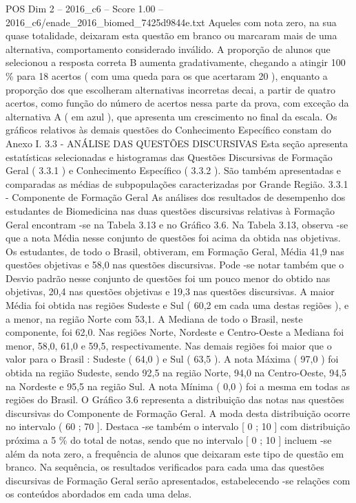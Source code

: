\begin{textsample}{POS Dim 2 – 2016\_c6 – Score 1.00 – 2016\_c6/enade\_2016\_biomed\_7425d9844e.txt}
Aqueles com nota zero, na sua quase totalidade, deixaram esta questão em branco ou marcaram mais de uma alternativa, comportamento considerado inválido.
A proporção de alunos que selecionou a resposta correta B aumenta gradativamente, chegando a atingir 100 \% para 18 acertos ( com uma queda para os que acertaram 20 ), enquanto a proporção dos que escolheram alternativas incorretas decai, a partir de quatro acertos, como função do número de acertos nessa parte da prova, com exceção da alternativa A ( em azul ), que apresenta um crescimento no final da escala.
Os gráficos relativos às demais questões do Conhecimento Específico constam do Anexo I. 3.3 - ANÁLISE DAS QUESTÕES DISCURSIVAS Esta seção apresenta estatísticas selecionadas e histogramas das Questões Discursivas de Formação Geral ( 3.3.1 ) e Conhecimento Específico ( 3.3.2 ).
São também apresentadas e comparadas as médias de subpopulações caracterizadas por Grande Região. 3.3.1 - Componente de Formação Geral As análises dos resultados de desempenho dos estudantes de Biomedicina nas duas questões discursivas relativas à Formação Geral encontram -se na Tabela 3.13 e no Gráfico 3.6.
Na Tabela 3.13, observa -se que a nota Média nesse conjunto de questões foi acima da obtida nas objetivas.
Os estudantes, de todo o Brasil, obtiveram, em Formação Geral, Média 41,9 nas questões objetivas e 58,0 nas questões discursivas.
Pode -se notar também que o Desvio padrão nesse conjunto de questões foi um pouco menor do obtido nas objetivas, 20,4 nas questões objetivas e 19,3 nas questões discursivas.
A maior Média foi obtida nas regiões Sudeste e Sul ( 60,2 em cada uma destas regiões ), e a menor, na região Norte com 53,1.
A Mediana de todo o Brasil, neste componente, foi 62,0.
Nas regiões Norte, Nordeste e Centro-Oeste a Mediana foi menor, 58,0, 61,0 e 59,5, respectivamente.
Nas demais regiões foi maior que o valor para o Brasil : Sudeste ( 64,0 ) e Sul ( 63,5 ).
A nota Máxima ( 97,0 ) foi obtida na região Sudeste, sendo 92,5 na região Norte, 94,0 na Centro-Oeste, 94,5 na Nordeste e 95,5 na região Sul.
A nota Mínima ( 0,0 ) foi a mesma em todas as regiões do Brasil.
O Gráfico 3.6 representa a distribuição das notas nas questões discursivas do Componente de Formação Geral.
A moda desta distribuição ocorre no intervalo ( 60 ; 70 ].
Destaca -se também o intervalo [ 0 ; 10 ] com distribuição próxima a 5 \% do total de notas, sendo que no intervalo [ 0 ; 10 ] incluem -se além da nota zero, a frequência de alunos que deixaram este tipo de questão em branco.
Na sequência, os resultados verificados para cada uma das questões discursivas de Formação Geral serão apresentados, estabelecendo -se relações com os conteúdos abordados em cada uma delas.

\end{textsample}
